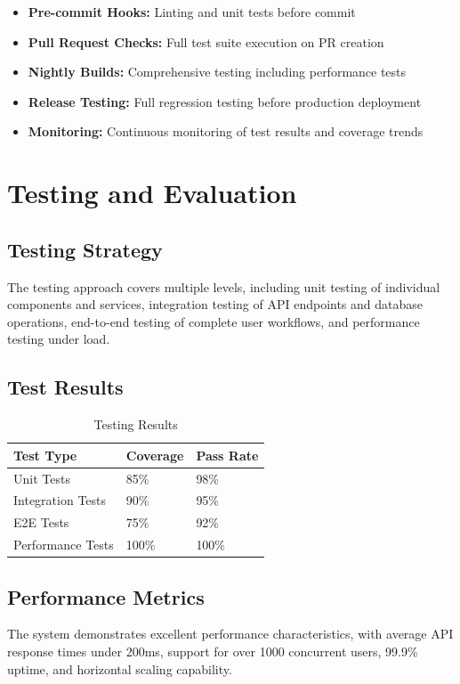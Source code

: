 \documentclass[conference]{IEEEtran}
\begin{document}
\begin{itemize}
    \item \textbf{Pre-commit Hooks:} Linting and unit tests before commit
    \item \textbf{Pull Request Checks:} Full test suite execution on PR creation
    \item \textbf{Nightly Builds:} Comprehensive testing including performance tests
    \item \textbf{Release Testing:} Full regression testing before production deployment
    \item \textbf{Monitoring:} Continuous monitoring of test results and coverage trends
\end{itemize}

\section{Testing and Evaluation}
\subsection{Testing Strategy}
The testing approach covers multiple levels, including unit testing of individual components and services, integration testing of API endpoints and database operations, end-to-end testing of complete user workflows, and performance testing under load.

\subsection{Test Results}
\begin{table}[ht]
\centering
\caption{Testing Results}
\begin{tabular}{|l|l|l|}
\hline
\textbf{Test Type} & \textbf{Coverage} & \textbf{Pass Rate} \\
\hline
Unit Tests & 85\% & 98\% \\
\hline
Integration Tests & 90\% & 95\% \\
\hline
E2E Tests & 75\% & 92\% \\
\hline
Performance Tests & 100\% & 100\% \\
\hline
\end{tabular}
\end{table}

\subsection{Performance Metrics}
The system demonstrates excellent performance characteristics, with average API response times under 200ms, support for over 1000 concurrent users, 99.9\% uptime, and horizontal scaling capability.
\end{document}
